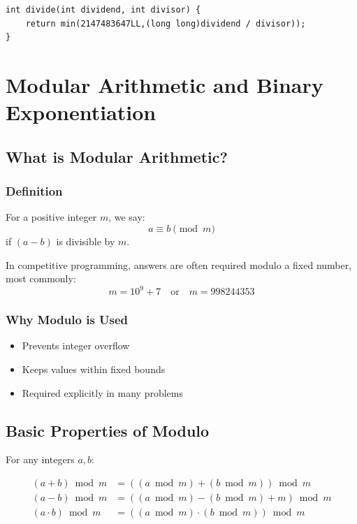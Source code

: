 \documentclass[11pt]{article}
\begin{document}
\begin{lstlisting}
int divide(int dividend, int divisor) {
    return min(2147483647LL,(long long)dividend / divisor));
}
\end{lstlisting}

\section{Modular Arithmetic and Binary Exponentiation}

\subsection{What is Modular Arithmetic?}

\subsubsection{Definition}
For a positive integer $m$, we say:
\[
a \equiv b \pmod{m}
\]
if $(a - b)$ is divisible by $m$.

In competitive programming, answers are often required modulo a fixed number, most commonly:
\[
m = 10^9 + 7 \quad \text{or} \quad m = 998244353
\]


\subsubsection{Why Modulo is Used}
\begin{itemize}
    \item Prevents integer overflow
    \item Keeps values within fixed bounds
    \item Required explicitly in many problems
\end{itemize}

\subsection{Basic Properties of Modulo}

For any integers $a, b$:

\begin{align*}
(a + b) \bmod m &= ((a \bmod m) + (b \bmod m)) \bmod m \\
(a - b) \bmod m &= ((a \bmod m) - (b \bmod m) + m) \bmod m \\
(a \cdot b) \bmod m &= ((a \bmod m) \cdot (b \bmod m)) \bmod m
\end{align*}
\end{document}
